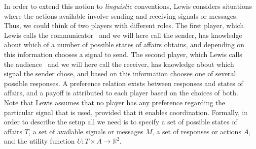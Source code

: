 \documentclass[a4paper]{article}
\begin{document}
In order to extend this notion to \emph{linguistic} conventions, Lewis considers situations where the actions available involve sending and receiving signals or messages.
Thus, we could think of two players with different roles.
The first player, which Lewis calls the communicator~\parencite*[130]{lewis_convention_1969} and we will here call the sender, has knowledge about which of a number of possible states of affairs obtains, and depending on this information chooses a signal to send.
The second player, which Lewis calls the audience~\parencite*[130]{lewis_convention_1969} and we will here call the receiver, has knowledge about which signal the sender chose, and based on this information chooses one of several possible responses.
A preference relation exists between responses and states of affairs, and a payoff is attributed to each player based on the choices of both.
Note that Lewis assumes that no player has any preference regarding the particular signal that is used, provided that it enables coordination.
Formally, in order to describe the setup all we need is to specify a set of possible states of affairs $T$, a set of available signals or messages $M$, a set of responses or actions $A$, and the utility function $U : T \times A \rightarrow \mathbb{R}^2$.
\end{document}

